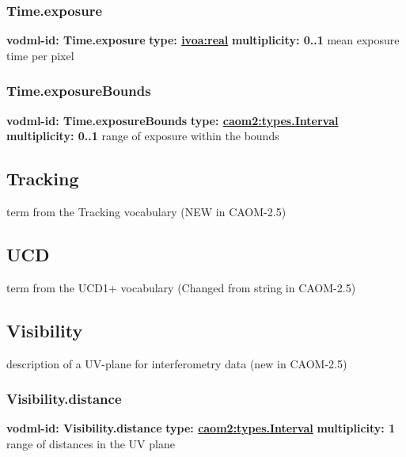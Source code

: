     \subsubsection{Time.exposure}
      \textbf{vodml-id: Time.exposure} \newline
      \textbf{type: \hyperref[sect:ivoa]{ivoa:real}} \newline
      \textbf{multiplicity: 0..1} \newline
      mean exposure time per pixel

    \subsubsection{Time.exposureBounds}
      \textbf{vodml-id: Time.exposureBounds} \newline
      \textbf{type: \hyperref[sect:types.Interval]{caom2:types.Interval}} \newline
      \textbf{multiplicity: 0..1} \newline
      range of exposure within the bounds

  \subsection{Tracking}
  \label{sect:Tracking}
    term from the Tracking vocabulary (NEW in CAOM-2.5)

  \subsection{UCD}
  \label{sect:UCD}
    term from the UCD1+ vocabulary (Changed from string in CAOM-2.5)

  \subsection{Visibility}
  \label{sect:Visibility}
    description of a UV-plane for interferometry data (new in CAOM-2.5)

    \subsubsection{Visibility.distance}
      \textbf{vodml-id: Visibility.distance} \newline
      \textbf{type: \hyperref[sect:types.Interval]{caom2:types.Interval}} \newline
      \textbf{multiplicity: 1} \newline
      range of distances in the UV plane

